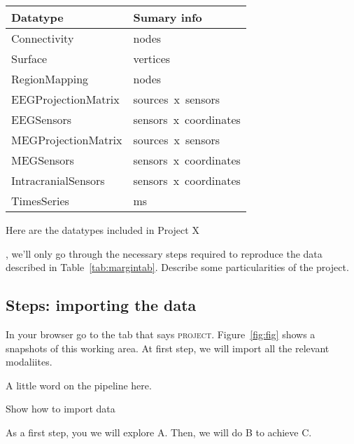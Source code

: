 \documentclass{tufte-handout}
\begin{document}
\begin{margintable}
  \centering
  \selectfont
  \begin{tabular}{ll}
    \toprule
    Datatype & Sumary info                       \\
    \midrule
    Connectivity         & \unit[X]{nodes}                    \\
    Surface              & \unit[15000 x 3]{vertices}     \\
    RegionMapping        & \unit[15000]{nodes}            \\
    EEGProjectionMatrix     & \unit[M x N]{sources x sensors} \\
    EEGSensors              & \unit[N x 4]{sensors x coordinates} \\
    MEGProjectionMatrix     & \unit[M x N]{sources x sensors} \\
    MEGSensors              & \unit[N x 4]{sensors x coordinates}\\
    IntracranialSensors     & \unit[N x 4]{sensors x coordinates} \\
    TimesSeries          & \unit[5000]{ms} \\
    \bottomrule
  \end{tabular}
  \caption{Here are the datatypes included in Project X}
  \label{tab:margintab}
\end{margintable}



, we'll only go through the necessary steps
required to reproduce the data described in Table~\ref{tab:margintab}.
Describe some particularities of the project. 


\subsection{Steps: importing the data}\label{sec:import}

In your browser go to the tab that says \textsc{project}.
Figure~\ref{fig:fig} shows a snapshots of this working area.
At first step, we will import all the relevant modaliites.

A little word on the pipeline here.

Show how to import data

As a first step, you we will explore {\color{RoyalBlue}\textsc{A}}. Then, we
will do {\color{RoyalBlue} \textsc{B}} to achieve
{\color{RoyalBlue} \textsc{C}}.
\end{document}
